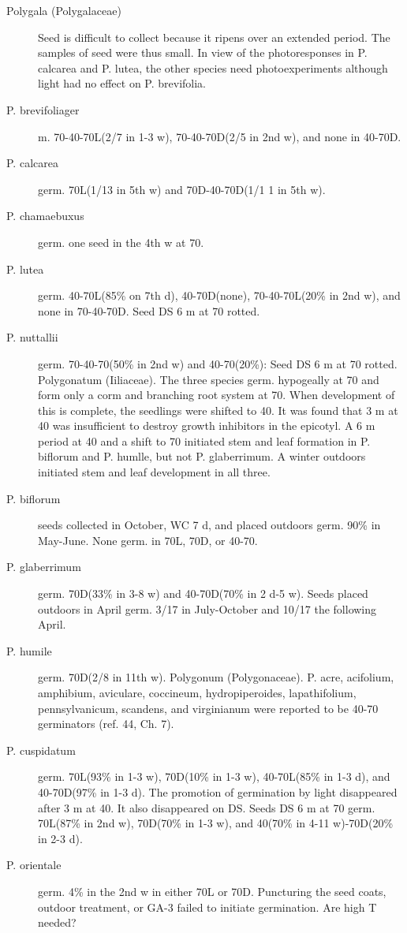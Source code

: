 \begin{description}
\item[Polygala (Polygalaceae)] Seed is difficult to collect because it ripens over
an extended period. The samples of seed were thus small. In view of the
photoresponses in P. calcarea and P. lutea, the other species need photoexperiments
although light had no effect on P. brevifolia.
\item[P. brevifoliager]m. 70-40-70L(2/7 in 1-3 w), 70-40-70D(2/5 in 2nd w), and none
in 40-70D.
\item[P. calcarea] germ. 70L(1/13 in 5th w) and 70D-40-70D(1/1 1 in 5th w).
\item[P. chamaebuxus] germ. one seed in the 4th w at 70.
\item[P. lutea] germ. 40-70L(85\% on 7th d), 40-70D(none), 70-40-70L(20\% in 2nd w),
and none in 70-40-70D. Seed DS 6 m at 70 rotted.
\item[P. nuttallii] germ. 70-40-70(50\% in 2nd w) and 40-70(20\%): Seed DS 6 m at 70
rotted. Polygonatum (Iiliaceae). The three species germ. hypogeally at 70 and
form only a corm and branching root system at 70. When development of this is
complete, the seedlings were shifted to 40. It was found that 3 m at 40 was insufficient
to destroy growth inhibitors in the epicotyl. A 6 m period at 40 and a shift to 70 initiated
stem and leaf formation in P. biflorum and P. humlle, but not P. glaberrimum. A winter
outdoors initiated stem and leaf development in all three.
\item[P. biflorum] seeds collected in October, WC 7 d, and placed outdoors germ. 90\%
in May-June. None germ. in 70L, 70D, or 40-70.
\item[P. glaberrimum] germ. 70D(33\% in 3-8 w) and 40-70D(70\% in 2 d-5 w). Seeds
placed outdoors in April germ. 3/17 in July-October and 10/17 the following April.
\item[P. humile] germ. 70D(2/8 in 11th w).
Polygonum (Polygonaceae). P. acre, acifolium, amphibium, aviculare,
coccineum, hydropiperoides, lapathifolium, pennsylvanicum, scandens, and
virginianum were reported to be 40-70 germinators (ref. 44, Ch. 7).
\item[P. cuspidatum] germ. 70L(93\% in 1-3 w), 70D(10\% in 1-3 w), 40-70L(85\% in 1-3
d), and 40-70D(97\% in 1-3 d). The promotion of germination by light disappeared
after 3 m at 40. It also disappeared on DS. Seeds DS 6 m at 70 germ. 70L(87\% in
2nd w), 70D(70\% in 1-3 w), and 40(70\% in 4-11 w)-70D(20\% in 2-3 d).
\item[P. orientale] germ. 4\% in the 2nd w in either 70L or 70D. Puncturing the seed
coats, outdoor treatment, or GA-3 failed to initiate germination. Are high T needed?


\end{description}
